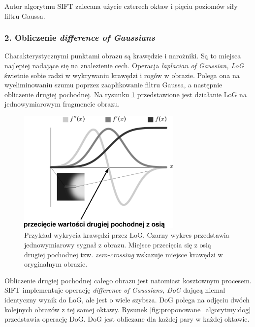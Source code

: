 Autor algorytmu SIFT zalecana użycie czterech oktaw i pięciu poziomów siły filtru Gaussa.

\subsubsection{2. Obliczenie \textit{difference of Gaussians}}
\label{sec:proponowane_algorytmy:difference}

Charakterystycznymi punktami obrazu są krawędzie i narożniki. Są to miejsca najlepiej nadające się na znalezienie cech. Operacja \textit{laplacian of Gaussian, LoG} świetnie sobie radzi w wykrywaniu krawędzi i rogów w obrazie. Polega ona na wyeliminowaniu szumu poprzez zaaplikowanie filtru Gaussa, a następnie obliczenie drugiej pochodnej. Na rysunku \ref{fig:proponowane_algorytmy:gauss} przedstawione jest działanie LoG na jednowymiarowym fragmencie obrazu.

\begin{figure}[H]
  \centering
  \includegraphics[width=8cm]{gfx/gauss}
  \caption{Przykład wykrycia krawędzi przez LoG. Czarny wykres przedstawia jednowymiarowy sygnał z obrazu. Miejsce przecięcia się z osią drugiej pochodnej tzw. \textit{zero-crossing} wskazuje miejsce krawędzi w oryginalnym obrazie.}
  \label{fig:proponowane_algorytmy:gauss}
\end{figure}

Obliczenie drugiej pochodnej całego obrazu jest natomiast kosztownym procesem. SIFT implementuje operację \textit{difference of Gaussians, DoG} dającą niemal identyczny wynik do LoG, ale jest o wiele szybsza. DoG polega na odjęciu dwóch kolejnych obrazów z tej samej oktawy. Rysunek \ref{fig:proponowane_algorytmy:dog} przedstawia operację DoG. DoG jest obliczane dla każdej pary w każdej oktawie.

